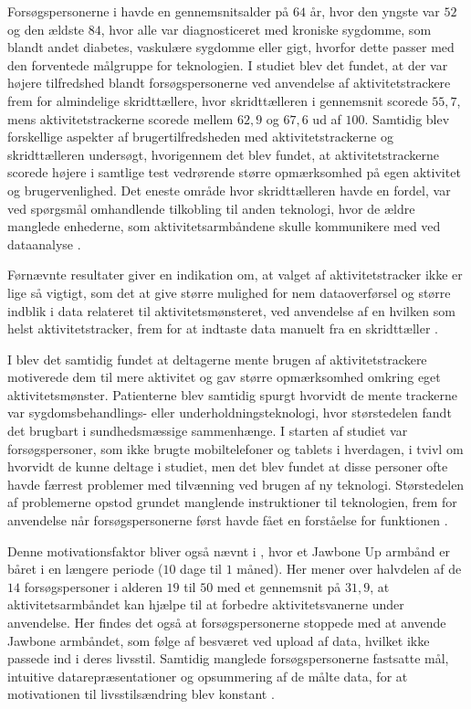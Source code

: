 Forsøgspersonerne i \citep{mercer2016} havde en gennemsnitsalder på $64$ år, hvor den yngste var $52$ og den ældste $84$, hvor alle var diagnosticeret med kroniske sygdomme, som blandt andet diabetes, vaskulære sygdomme eller gigt, hvorfor dette passer med den forventede målgruppe for teknologien. I studiet blev det fundet, at der var højere tilfredshed blandt forsøgspersonerne ved anvendelse af aktivitetstrackere frem for almindelige skridttællere, hvor skridttælleren i gennemsnit scorede $55,7$, mens aktivitetstrackerne scorede mellem $62,9$ og $67,6$ ud af $100$. Samtidig blev forskellige aspekter af brugertilfredsheden med aktivitetstrackerne og skridttælleren undersøgt, hvorigennem det blev fundet, at aktivitetstrackerne scorede højere i samtlige test vedrørende større opmærksomhed på egen aktivitet og brugervenlighed. Det eneste område hvor skridttælleren havde en fordel, var ved spørgsmål omhandlende tilkobling til anden teknologi, hvor de ældre manglede enhederne, som aktivitetsarmbåndene skulle kommunikere med ved dataanalyse \citep{mercer2016}.

Førnævnte resultater giver en indikation om, at valget af aktivitetstracker ikke er lige så vigtigt, som det at give større mulighed for nem dataoverførsel og større indblik i data relateret til aktivitetsmønsteret, ved anvendelse af en hvilken som helst aktivitetstracker, frem for at indtaste data manuelt fra en skridttæller \citep{mercer2016}.

I \citep{mercer2016} blev det samtidig fundet at deltagerne mente brugen af aktivitetstrackere motiverede dem til mere aktivitet og gav større opmærksomhed omkring eget aktivitetsmønster. Patienterne blev samtidig spurgt hvorvidt de mente trackerne var sygdomsbehandlings- eller underholdningsteknologi, hvor størstedelen fandt det brugbart i sundhedsmæssige sammenhænge. I starten af studiet var forsøgspersoner, som ikke brugte mobiltelefoner og tablets i hverdagen, i tvivl om hvorvidt de kunne deltage i studiet, men det blev fundet at disse personer ofte havde færrest problemer med tilvænning ved brugen af ny teknologi. Størstedelen af problemerne opstod grundet manglende instruktioner til teknologien, frem for anvendelse når forsøgspersonerne først havde fået en forståelse for funktionen \citep{mercer2016}.

Denne motivationsfaktor bliver også nævnt i \citep{rapp2016}, hvor et Jawbone Up armbånd er båret i en længere periode ($10$ dage til $1$ måned). Her mener over halvdelen af de $14$ forsøgspersoner i alderen $19$ til $50$ med et gennemsnit på $31,9$, at aktivitetsarmbåndet kan hjælpe til at forbedre aktivitetsvanerne under anvendelse. Her findes det også at forsøgspersonerne stoppede med at anvende Jawbone armbåndet, som følge af besværet ved upload af data, hvilket ikke passede ind i deres livsstil. Samtidig manglede forsøgspersonerne fastsatte mål, intuitive datarepræsentationer og opsummering af de målte data, for at motivationen til livsstilsændring blev konstant \citep{rapp2016}.

